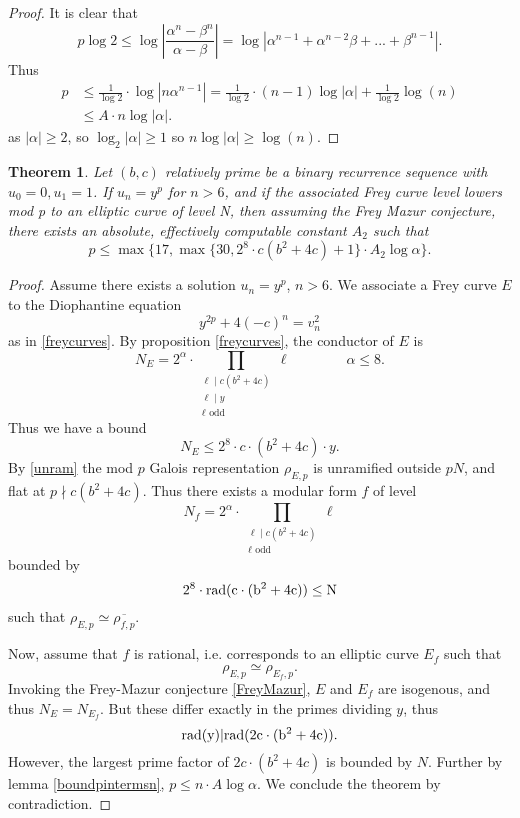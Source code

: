 \documentclass[12pt]{amsart}
\newtheorem{thm}{Theorem}[section]
\theoremstyle{definition}
\newcommand{\rad}{\rm rad}
\renewcommand{\bar}{\overline}
\newcommand{\notdiv}{\nmid}
\newcommand{\bfrac}[2]{\left| \frac{#1}{#2} \right|}
\begin{document}
\begin{proof}
It is clear that
\[p\log{2} \leq \log \bfrac{\alpha^n - \beta^n}{\alpha-\beta}  = \log|\alpha^{n-1}+ \alpha^{n-2}\beta+...+\beta^{n-1}|. \]
Thus
\begin{align*}
p & \leq  \frac{1}{\log{2}} \cdot \log|n\alpha^{n-1}| = \frac{1}{\log{2}} \cdot (n-1)\log|\alpha| + \frac{1}{\log{2}} \log(n)  \\
& \leq A\cdot n \log|\alpha|.
\end{align*}
as $|\alpha| \geq 2$, so $\log_2|\alpha| \geq 1$ so $n\log|\alpha| \geq  \log(n)$.
\end{proof}

\begin{thm}\label{ell_bound_final}
Let $(b,c)$ relatively prime be a binary recurrence sequence with $u_0=0,u_1=1$. If $u_n = y^p$ for $n>6$, and if the associated Frey curve level lowers mod p to an elliptic curve of level N, then assuming the Frey Mazur conjecture, there exists an absolute, effectively computable constant $A_2$ such that
\[ p \leq \max\{17, \max\{30, 2^{8} \cdot c (b^2+4c)+1\} \cdot A_2\log{\alpha} \}. \]
\end{thm}

\begin{proof}
Assume there exists a solution $u_n = y^p$, $n > 6$.
We associate a Frey curve $E$ to the Diophantine equation
\[ y^{2p} +4(-c)^n = v_n^2 \]
as in \ref{freycurves}.  By proposition \ref{freycurves}, the conductor of $E$ is
\[ N_E = 2^{\alpha}  \cdot \prod_{\substack{ \ell \mid c(b^2+4c) \\ \ell \mid y \\ \ell \text{ odd}}} \ell \qquad \qquad \alpha \leq 8. \]
Thus we have a bound
\[ N_E \leq  2^{8} \cdot c \cdot (b^2+4c) \cdot y.\] 
By \ref{unram} the mod $p$ Galois representation $\rho_{E,p}$ is unramified outside $pN$, and flat at $p \notdiv c(b^2+4c)$.  Thus there exists a modular form $f$ of level 
\[N_f = 2^{\alpha} \cdot \prod_{\substack{ \ell \mid c(b^2+4c) \\ \ell \text{ odd}}} \ell \]
bounded by 
\[ 2^8 \cdot  \rad(c \cdot (b^2+4c)) \leq N \]
such that $\rho_{E,p} \simeq \bar{\rho_{f,p}} $.  

Now, assume that $f$ is rational, i.e. corresponds to an elliptic curve $E_f$ such that
\[ \rho_{E,p} \simeq \rho_{E_f,p}. \]  
Invoking the Frey-Mazur conjecture \ref{FreyMazur}, $E$ and $E_f$ are isogenous, and thus $N_E = N_{E_f}$.  But these differ exactly in the primes dividing $y$, thus
\[ \rad(y) | \rad(2c \cdot (b^2+4c)). \]
However, the largest prime factor of $2c \cdot (b^2+4c)$ is bounded by $N$.  Further by lemma \ref{boundpintermsn}, $p \leq n \cdot A\log{\alpha}$.  We conclude the theorem by contradiction.
\end{proof}
\end{document}
